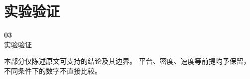 
\section{实验验证}

\begin{frame}[plain]
  \begin{center}
    \vspace{1.2cm}
    {\color{yopoblue}\Huge\bfseries 03}\\[0.5em]
    {\color{yopoblue}\LARGE 实验验证}\\[1.2em]
    \begin{minipage}{0.76\textwidth}
      \small\color{yopogray}
      本部分仅陈述原文可支持的结论及其边界。
      平台、密度、速度等前提均予保留，不同条件下的数字不直接比较。
    \end{minipage}
  \end{center}
\end{frame}

